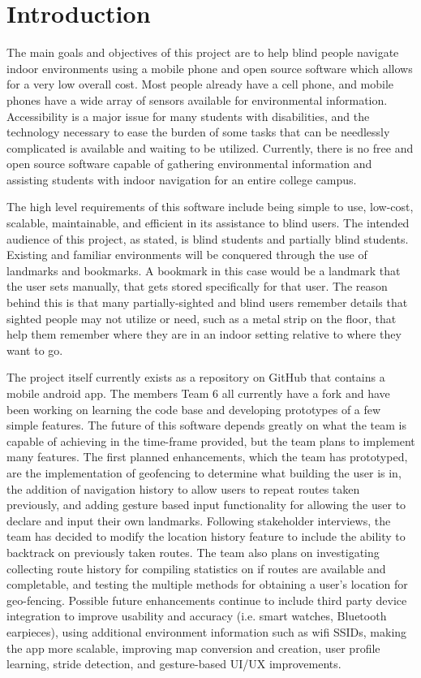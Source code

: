 \documentclass{scrreprt}
\begin{document}
\chapter{Introduction}
The main goals and objectives of this project are to help blind people navigate indoor environments using a mobile phone and open source software which allows for a very low overall cost. Most people already have a cell phone, and mobile phones have a wide array of sensors available for environmental information. Accessibility is a major issue for many students with disabilities, and the technology necessary to ease the burden of some tasks that can be needlessly complicated is available and waiting to be utilized. Currently, there is no free and open source software capable of gathering environmental information and assisting students with indoor navigation for an entire college campus.

	The high level requirements of this software include being simple to use, low-cost, scalable, maintainable, and efficient in its assistance to blind users. The intended audience of this project, as stated, is blind students and partially blind students. Existing and familiar environments will be conquered through the use of landmarks and bookmarks. A bookmark in this case would be a landmark that the user sets manually, that gets stored specifically for that user. The reason behind this is that many partially-sighted and blind users remember details that sighted people may not utilize or need, such as a metal strip on the floor, that help them remember where they are in an indoor setting relative to where they want to go.
	
	The project itself currently exists as a repository on GitHub that contains a mobile android app. The members Team 6 all currently have a fork and have been working on learning the code base and developing prototypes of a few simple features. The future of this software depends greatly on what the team is capable of achieving in the time-frame provided, but the team plans to implement many features. The first planned enhancements, which the team has prototyped, are the implementation of geofencing to determine what building the user is in, the addition of navigation history to allow users to repeat routes taken previously, and adding gesture based input functionality for allowing the user to declare and input their own landmarks. Following stakeholder interviews, the team has decided to modify the location history feature to include the ability to backtrack on previously taken routes. The team also plans on investigating collecting route history for compiling statistics on if routes are available and completable, and testing the multiple methods for obtaining a user’s location for geo-fencing. Possible future enhancements continue to include third party device integration to improve usability and accuracy (i.e. smart watches, Bluetooth earpieces), using additional environment information such as wifi SSIDs, making the app more scalable, improving map conversion and creation, user profile learning, stride detection, and gesture-based UI/UX improvements.
\end{document}
